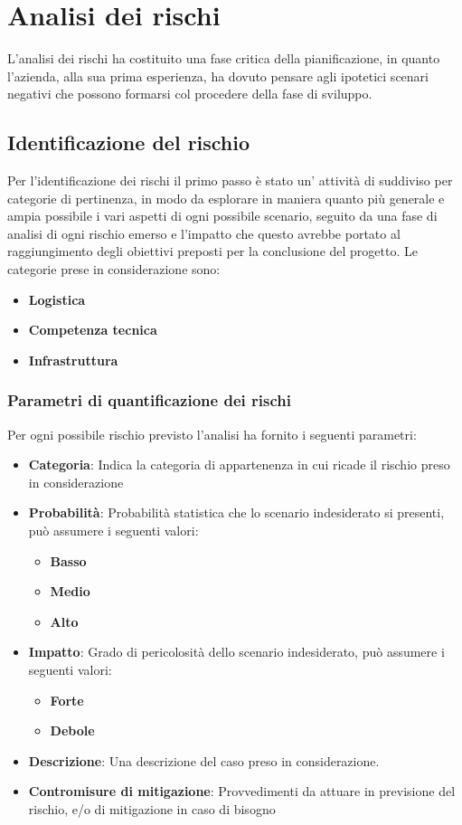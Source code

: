\documentclass{scalatekids-article}
\begin{document}
\section{Analisi dei rischi}
L'analisi dei rischi ha costituito una fase critica della pianificazione, in
quanto l'azienda, alla sua prima esperienza, ha dovuto pensare agli ipotetici
scenari negativi che possono formarsi col procedere della fase di sviluppo.
\subsection{Identificazione del rischio}
Per l'identificazione dei rischi il primo passo è stato un' attività di
 suddiviso per categorie di pertinenza, in modo da esplorare
in maniera quanto più generale e ampia possibile i vari aspetti di ogni
possibile scenario, seguito da una fase di analisi di ogni rischio emerso e
l'impatto che questo avrebbe portato al raggiungimento degli obiettivi preposti
per la conclusione del progetto. Le categorie prese in considerazione sono:
\begin{itemize}
\item\textbf{Logistica}
\item\textbf{Competenza tecnica}
\item\textbf{Infrastruttura}
\end{itemize}
\subsubsection{Parametri di quantificazione dei rischi}
Per ogni possibile rischio previsto l'analisi ha fornito i seguenti parametri:
\begin{itemize}
\item\textbf{Categoria}: Indica la categoria di appartenenza in cui ricade il
  rischio preso in considerazione
\item\textbf{Probabilità}: Probabilità statistica che lo scenario indesiderato
  si presenti, può assumere i seguenti valori:
  \begin{itemize}
  \item\textbf{Basso}
  \item\textbf{Medio}
  \item\textbf{Alto}
  \end{itemize}
\item\textbf{Impatto}: Grado di pericolosità dello scenario indesiderato, può
  assumere i seguenti valori:
  \begin{itemize}
  \item\textbf{Forte}
  \item\textbf{Debole}
  \end{itemize}
\item\textbf{Descrizione}: Una descrizione del caso preso in considerazione.
\item\textbf{Contromisure di mitigazione}: Provvedimenti da attuare in
  previsione del rischio, e/o di mitigazione in caso di bisogno
\end{itemize}
\end{document}

